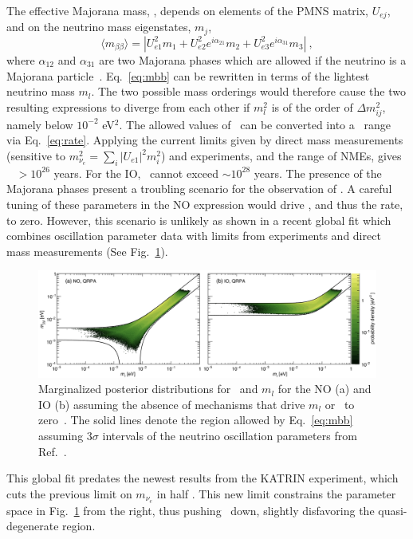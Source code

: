 The effective Majorana mass, \mbb, depends on elements of the PMNS matrix, $U_{ej}$, and on the neutrino mass eigenstates, $m_j$, 
\begin{equation}
\langle m_{\beta\beta} \rangle = \left|U_{e1}^2 m_1 + U_{e2}^2 e^{i\alpha_{21}} m_2 + U_{e3}^2 e^{i\alpha_{31}} m_3 \right|~,
\label{eq:mbb}
\end{equation}
where $\alpha_{12}$ and $\alpha_{31}$ are two Majorana phases which are allowed if the neutrino is a Majorana particle~\cite{disc_prob0vbb}. Eq.~\ref{eq:mbb} can be rewritten in terms of the lightest neutrino mass $m_l$. The two possible mass orderings would therefore cause the two resulting expressions to diverge from each other if $m^2_l$ is of the order of $\Delta m^2_{ij}$, namely below $10^{-2}$ eV$^2$. The allowed values of \mbb~can be converted into a \Thalf~range via Eq.~\ref{eq:rate}. Applying the current limits given by direct mass measurements (sensitive to $m^2_{\nu_e} = \sum_{i}|U_{e1}|^2m^2_i$) and \novbb{} experiments, and the range of NMEs, gives \Thalf~ $ > 10^{26}$ years.  For the IO, \Thalf~cannot exceed $\sim 10^{28}$ years. The presence of the Majorana phases present a troubling scenario for the observation of \novbb{}. A careful tuning of these parameters in the NO expression would drive \mbb{}, and thus the \novbb{} rate, to zero. However, this scenario is unlikely as shown in a recent global fit which combines oscillation parameter data with limits from \novbb{} experiments and direct mass measurements (See Fig.~\ref{fig:globalfits}).
\begin{figure}[htb]
	\centering
	\includegraphics[width=1\linewidth]{figs/0vbb/globalfits}
	\caption{Marginalized posterior distributions for \mbb~and $m_l$ for the NO (a) and IO (b) assuming the absence of mechanisms that drive $m_l$ or \mbb~to zero~\cite{disc_prob0vbb}. The solid lines denote the region allowed by Eq.~\ref{eq:mbb} assuming 3$\sigma$ intervals of the neutrino oscillation parameters from Ref.~\cite{nufit}.}
	\label{fig:globalfits}
\end{figure}
This global fit predates the newest results from the KATRIN experiment, which cuts the previous limit on $m_{\nu_e}$ in half \cite{katrin, troitsk}. This new limit constrains the parameter space in Fig.~\ref{fig:globalfits} from the right, thus pushing \Thalf~down, slightly disfavoring the quasi-degenerate region. 


